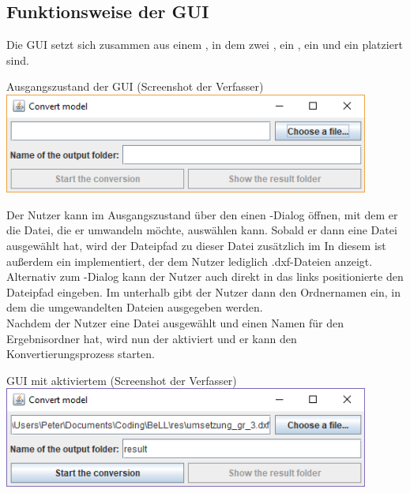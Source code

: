 \subsection{Funktionsweise der GUI}
Die GUI setzt sich zusammen aus einem , in dem zwei , ein , ein  und ein  platziert sind.

\begin{Bild}{Ausgangszustand der GUI (Screenshot der Verfasser)}
	\includegraphics[width = 120mm]{Bilder/GUI/GUI_Startup}
\end{Bild}

Der Nutzer kann im Ausgangszustand über den  einen -Dialog öffnen, mit dem er die Datei, die er umwandeln möchte, auswählen kann.
Sobald er dann eine Datei ausgewählt hat, wird der Dateipfad zu dieser Datei zusätzlich im 
In diesem  ist außerdem ein  implementiert, der dem Nutzer lediglich .dxf-Dateien anzeigt.
Alternativ zum -Dialog kann der Nutzer auch direkt in das links positionierte  den Dateipfad eingeben.
Im  unterhalb gibt der Nutzer dann den Ordnernamen ein, in dem die umgewandelten Dateien ausgegeben werden. \\
Nachdem der Nutzer eine Datei ausgewählt und einen Namen für den Ergebnisordner hat, wird nun der  aktiviert und er kann den Konvertierungsprozess starten.

\begin{Bild}{GUI mit aktiviertem  (Screenshot der Verfasser)}
	\includegraphics[width = 120mm]{Bilder/GUI/GUI_Convert_Ready}
\end{Bild}

